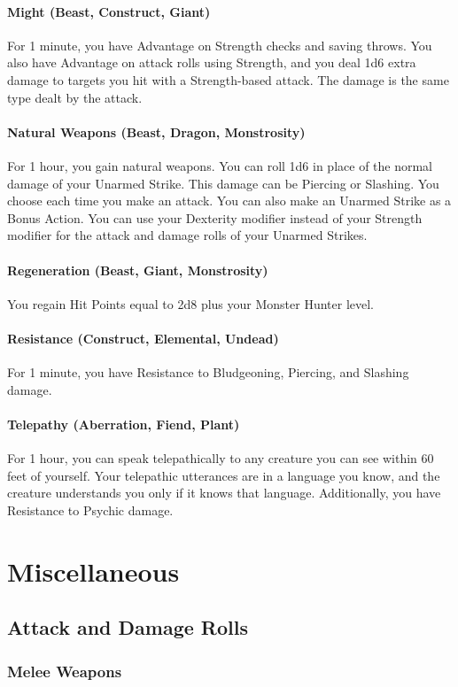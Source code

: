 \documentclass[letterpaper,openany,oneside,twocolumn]{book}
\begin{document}
\paragraph*{Might (Beast, Construct, Giant)} For 1 minute, you have Advantage on Strength checks and saving throws. You also have Advantage on attack rolls using Strength, and you deal 1d6 extra damage to targets you hit with a Strength-based attack. The damage is the same type dealt by the attack.
\paragraph*{Natural Weapons (Beast, Dragon, Monstrosity)} For 1 hour, you gain natural weapons. You can roll 1d6 in place of the normal damage of your Unarmed Strike. This damage can be Piercing or Slashing. You choose each time you make an attack. You can also make an Unarmed Strike as a Bonus Action. You can use your Dexterity modifier instead of your Strength modifier for the attack and damage rolls of your Unarmed Strikes.
\paragraph*{Regeneration (Beast, Giant, Monstrosity)} You regain Hit Points equal to 2d8 plus your Monster Hunter level.
\paragraph*{Resistance (Construct, Elemental, Undead)} For 1 minute, you have Resistance to Bludgeoning, Piercing, and Slashing damage.
\paragraph*{Telepathy (Aberration, Fiend, Plant)} For 1 hour, you can speak telepathically to any creature you can see within 60 feet of yourself. Your telepathic utterances are in a language you know, and the creature understands you only if it knows that language. Additionally, you have Resistance to Psychic damage.
\vfill\eject
\section*{Miscellaneous}
\subsection*{Attack and Damage Rolls}
\subsubsection*{Melee Weapons}
\end{document}
